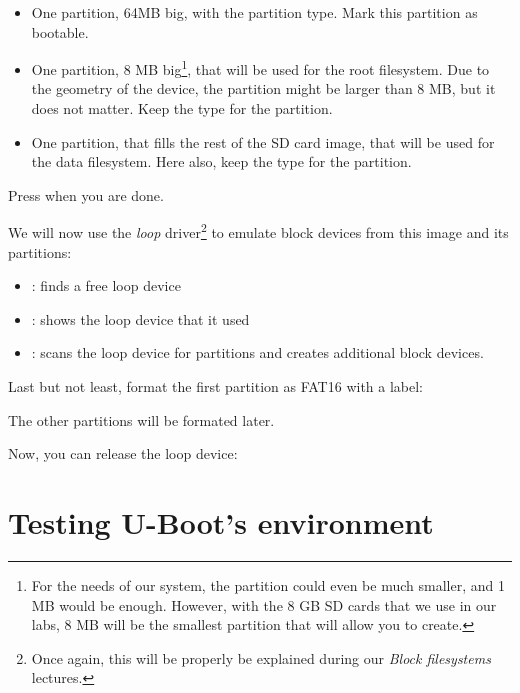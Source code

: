 \begin{itemize}
\item One partition, 64MB big, with the  partition type.
      Mark this partition as bootable.

\item One partition, 8 MB big\footnote{For the needs of our system,
  the partition could even be much smaller, and 1 MB would be enough.
  However, with the 8 GB SD cards that we use in our labs, 8 MB will
  be the smallest partition that  will allow you to
  create.}, that will be used for the root filesystem. Due to the
  geometry of the device, the partition might be larger than 8 MB,
  but it does not matter. Keep the  type for the
  partition.

\item One partition, that fills the rest of the SD card image, that will be
  used for the data filesystem. Here also, keep the  type
  for the partition.
\end{itemize}

Press  when you are done.

We will now use the {\em loop} driver\footnote{Once again, this will
be properly be explained during our {\em Block filesystems} lectures.}
to emulate block devices from this image and its partitions:


\begin{itemize}
\item {}: finds a free loop device
\item {}: shows the loop device that it used
\item {}: scans the loop device for partitions
    and creates additional  block devices.
\end{itemize}

Last but not least, format the first partition as FAT16 with
a  label:


The other partitions will be formated later.

Now, you can release the loop device:

\section{Testing U-Boot's environment}

